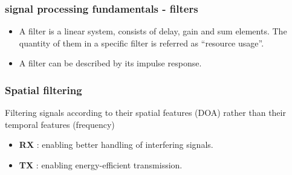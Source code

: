 \documentclass[10pt,pdflatex,headrule,landscape]{beamer}
\begin{document}
\begin{frame}
\frametitle{signal processing fundamentals - filters}
\begin{itemize}
\item{
A filter is a linear system, consists of delay, gain and sum elements. The quantity of them in a specific filter is referred as ``resource usage''.
}
\item{
A filter can be described by its impulse response.
}
\end{itemize}
\end{frame}

\begin{frame}
\frametitle{Spatial filtering}
Filtering signals according to their spatial features (DOA) rather than their temporal features (frequency)
\begin{itemize}
\item 
{
\textbf{RX} : enabling better handling of interfering signals.
}
\item 
{
\textbf{TX} : enabling energy-efficient transmission.
}
\end{itemize}
\end{frame}
\end{document}
